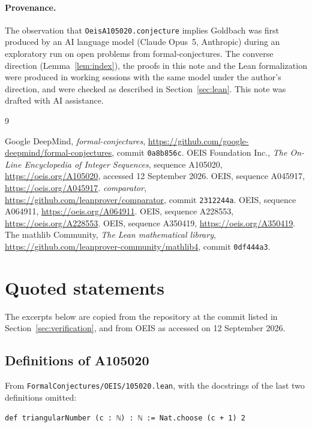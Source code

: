 \documentclass[11pt,a4paper]{article}
\newcommand{\li}{\lstinline[style=inline]}
\theoremstyle{plain}
\theoremstyle{remark}
\begin{document}
{\paragraph{Provenance.}
The observation that \li{OeisA105020.conjecture} implies Goldbach was first produced
by an AI language model (Claude Opus~5, Anthropic) during an exploratory run on open
problems from formal-conjectures. The converse direction (Lemma~\ref{lem:index}), the
proofs in this note and the Lean formalization were produced in working sessions with
the same model under the author's direction, and were checked as described in
Section~\ref{sec:lean}. This note was drafted with AI assistance.

\begin{thebibliography}{9}
\raggedright
{} Google DeepMind, \emph{formal-conjectures},
  \url{https://github.com/google-deepmind/formal-conjectures}, commit \texttt{0a8b856c}.
 OEIS Foundation Inc., \emph{The On-Line Encyclopedia of Integer
  Sequences}, sequence A105020, \url{https://oeis.org/A105020}, accessed 12 September
  2026.
 OEIS, sequence A045917, \url{https://oeis.org/A045917}.
 \emph{comparator}, \url{https://github.com/leanprover/comparator},
  commit \texttt{2312244a}.
 OEIS, sequence A064911, \url{https://oeis.org/A064911}.
 OEIS, sequence A228553, \url{https://oeis.org/A228553}.
 OEIS, sequence A350419, \url{https://oeis.org/A350419}.
 The mathlib Community, \emph{The Lean mathematical library},
  \url{https://github.com/leanprover-community/mathlib4}, commit \texttt{0df444a3}.
\end{thebibliography}

\clearpage
\appendix

\section{Quoted statements}\label{app:quoted}

The excerpts below are copied from the repository at the commit listed in
Section~\ref{sec:verification}, and from OEIS as accessed on 12 September 2026.

\subsection{Definitions of A105020}\label{app:defs}

From \nolinkurl{FormalConjectures/OEIS/105020.lean}, with the docstrings of the
last two definitions omitted:
\begin{lstlisting}
def triangularNumber (c : ℕ) : ℕ := Nat.choose (c + 1) 2


\end{lstlisting}}
\end{document}
